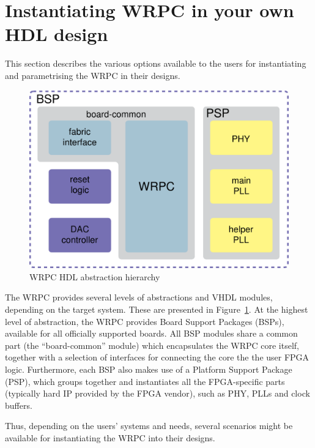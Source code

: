 \section{Instantiating WRPC in your own HDL design}
This section describes the various options available to the users for instantiating and
parametrising the WRPC in their designs.

\begin{figure}[ht]
  \begin{center}
    \includegraphics[width=.6\textwidth]{fig/wrpc_board.pdf}
    \caption{WRPC HDL abstraction hierarchy}
    \label{fig:wrpc_board}
  \end{center}
\end{figure}

The WRPC provides several levels of abstractions and VHDL modules, depending on the target
system. These are presented in Figure~\ref{fig:wrpc_board}. At the highest level of abstraction, the
WRPC provides Board Support Packages (BSPs), available for all officially supported boards. All BSP
modules share a common part (the ``board-common'' module) which encapsulates the WRPC core itself,
together with a selection of interfaces for connecting the core the the user FPGA
logic. Furthermore, each BSP also makes use of a Platform Support Package (PSP), which groups
together and instantiates all the FPGA-specific parts (typically hard IP provided by the FPGA
vendor), such as PHY, PLLs and clock buffers.

Thus, depending on the users' systems and needs, several scenarios might be available for
instantiating the WRPC into their designs.

